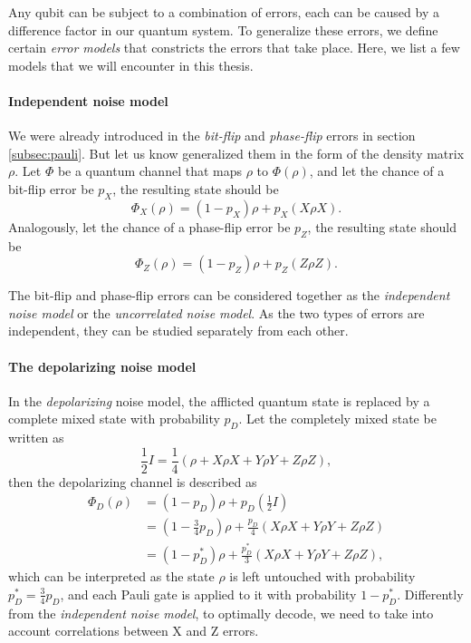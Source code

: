 Any qubit can be subject to a combination of errors, each can be caused by a difference factor in our quantum system. To generalize these errors, we define certain \emph{error models} that constricts the errors that take place. Here, we list a few models that we will encounter in this thesis. 

\paragraph{Independent noise model}
We were already introduced in the \emph{bit-flip} and \emph{phase-flip} errors in section \ref{subsec:pauli}. But let us know generalized them in the form of the density matrix $\rho$. Let $\Phi$ be a quantum channel that maps $\rho$ to $\Phi(\rho)$, and let the chance of a bit-flip error be $p_X$, the resulting state should be
\begin{equation}\label{qec:eq:bitflip}
  \Phi_X(\rho) = (1-p_X)\rho + p_X(X\rho X).
\end{equation}
Analogously, let the chance of a phase-flip error be $p_Z$, the resulting state should be
\begin{equation}\label{qec:eq:phaseflip}
  \Phi_Z(\rho) = (1-p_Z)\rho + p_Z(Z\rho Z).
\end{equation}

The bit-flip and phase-flip errors can be considered together as the \emph{independent noise model} or the \emph{uncorrelated noise model}. As the two types of errors are independent, they can be studied separately from each other.

\paragraph{The depolarizing noise model}
In the \emph{depolarizing} noise model, the afflicted quantum state is replaced by a complete mixed state with probability $p_D$. Let the completely mixed state be written as
\begin{equation}\label{qec:eq:mixstate}
  \frac{1}{2}I = \frac{1}{4}(\rho + X\rho X + Y\rho Y + Z\rho Z),
\end{equation}
then the depolarizing channel is described as
\begin{align}\label{qec:eq:depolarizing}
  \nonumber \Phi_D(\rho) &= (1-p_D)\rho + p_D\left(\frac{1}{2}I\right) \\
  \nonumber &= \left(1-\frac{3}{4}p_D\right)\rho + \frac{p_D}{4}(X\rho X + Y\rho Y + Z\rho Z) \\
  &= (1-p^*_D)\rho + \frac{p^*_D}{3}(X\rho X + Y\rho Y + Z\rho Z),
\end{align}
which can be interpreted as the state $\rho$ is left untouched with probability $p^*_D =\frac{3}{4}p_D$, and each Pauli gate is applied to it with probability $1-p^*_D$. Differently from the \emph{independent noise model}, to optimally decode, we need to take into account correlations between X and Z errors.

